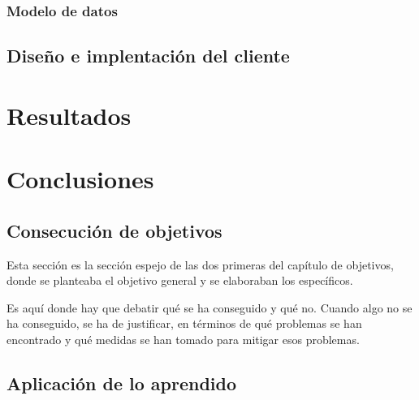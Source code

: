 \documentclass[a4paper, 12pt]{book}
\begin{document}
\subsection{Modelo de datos}


\section{Diseño e implentación del cliente} 
\label{sec:arquitecturaCliente}


\cleardoublepage
\chapter{Resultados}





\cleardoublepage
\chapter{Conclusiones}
\label{chap:conclusiones}


\section{Consecución de objetivos}
\label{sec:consecucion-objetivos}

Esta sección es la sección espejo de las dos primeras del capítulo de objetivos,
donde se planteaba el objetivo general y se elaboraban los específicos.

Es aquí donde hay que debatir qué se ha conseguido y qué no. Cuando algo no
se ha conseguido, se ha de justificar, en términos de qué problemas se han
encontrado y qué medidas se han tomado para mitigar esos problemas.


\section{Aplicación de lo aprendido}
\label{sec:aplicacion}
\end{document}
